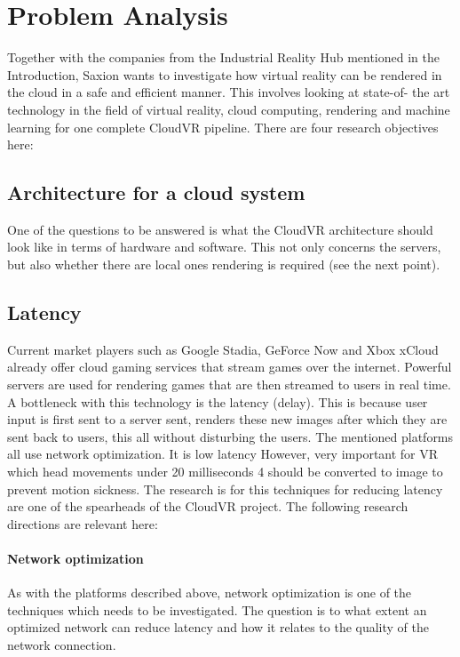 \section{Problem Analysis}

Together with the companies from the Industrial Reality Hub mentioned in the Introduction, Saxion wants to investigate how virtual reality
can be rendered in the cloud in a safe and efficient manner. This involves looking at state-of-
the art technology in the field of virtual reality, cloud computing, rendering and machine learning for one
complete CloudVR pipeline. There are four research objectives here:

\subsection{Architecture for a cloud system}
One of the questions to be answered is what the CloudVR architecture should look like
in terms of hardware and software. This not only concerns the servers, but also whether there are local ones
rendering is required (see the next point).

\subsection{Latency}
Current market players such as Google Stadia, GeForce Now and Xbox xCloud already offer cloud gaming
services that stream games over the internet. Powerful servers are used for rendering
games that are then streamed to users in real time. A bottleneck with this technology is the latency (delay). This is because user input is first sent to a server
sent, renders these new images after which they are sent back to users, this
all without disturbing the users.
The mentioned platforms all use network optimization. It is low latency
However, very important for VR which head movements under 20 milliseconds 4 should be
converted to image to prevent motion sickness. The research is for this
techniques for reducing latency are one of the spearheads of the CloudVR project.
The following research directions are relevant here:
\paragraph{Network optimization}
As with the platforms described above, network optimization is one of the techniques
which needs to be investigated. The question is to what extent an optimized network
can reduce latency and how it relates to the quality of the network connection.

